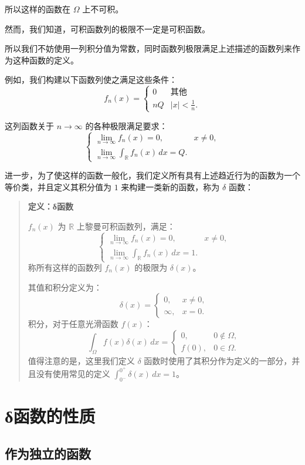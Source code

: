 \documentclass[12pt]{article}
\begin{document}
所以这样的函数在 $\Omega$ 上不可积。

然而，我们知道，可积函数列的极限不一定是可积函数。

所以我们不妨使用一列积分值为常数，同时函数列极限满足上述描述的函数列来作为这种函数的定义。

例如，我们构建以下函数列使之满足这些条件：
\[
f_n(x) =
\begin{cases}
0 & \text{其他} \\
nQ & |x| < \frac{1}{n}.
\end{cases}
\]

这列函数关于 $n \to \infty$ 的各种极限满足要求：
\[
\begin{cases}
\lim_{n \to \infty} f_n(x) = 0, & x \neq 0, \\
\lim_{n \to \infty} \int_{\mathbb{R}} f_n(x) \, dx = Q.
\end{cases}
\]

进一步，为了使这样的函数一般化，我们定义所有具有上述趋近行为的函数为一个等价类，并且定义其积分值为 $1$ 来构建一类新的函数，称为 $\delta$ 函数：

\begin{quote}
\textbf{定义：δ函数}

${f_n(x)}$ 为 $\mathbb{R}$ 上黎曼可积函数列，满足：
\[
\begin{cases}
\lim_{n \to \infty} f_n(x) = 0, & x \neq 0, \\
\lim_{n \to \infty} \int_{\mathbb{R}} f_n(x) \, dx = 1.
\end{cases}
\]
称所有这样的函数列 ${f_n(x)}$ 的极限为 $\delta(x)$。

其值和积分定义为：
\[
\delta(x) =
\begin{cases}
0, & x \neq 0, \\
\infty, & x = 0.
\end{cases}
\]
积分，对于任意光滑函数 $f(x)$：
\[
\int_\Omega f(x) \delta(x) \, dx =
\begin{cases}
0, & 0 \notin \Omega, \\
f(0), & 0 \in \Omega.
\end{cases}
\]
值得注意的是，这里我们定义 $\delta$ 函数时使用了其积分作为定义的一部分，并且没有使用常见的定义 $\int_{0^-}^{0^+} \delta(x) \, dx = 1$。
\end{quote}

\section*{δ函数的性质}

\subsection*{作为独立的函数}
\end{document}
